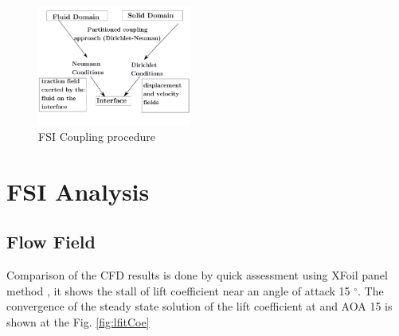 \begin{figure}[ht!]
\centering
\includegraphics[width=0.45\textwidth]{Figures/FSI.pdf}
\caption{FSI Coupling procedure}
\label{fig:airfoilSegments} 
\end{figure}





\section{FSI Analysis}
\label{sec:results}




\subsection{Flow Field}
\label{sec:flowField}

%
Comparison of the CFD results is done by quick assessment using XFoil panel method \cite{Drela1987}, it shows the stall of lift coefficient near an angle of attack 15 $^\circ$. 
%
The convergence of the steady state solution of the lift coefficient  at and AOA 15 is shown at the Fig. \ref{fig:lfitCoe}





